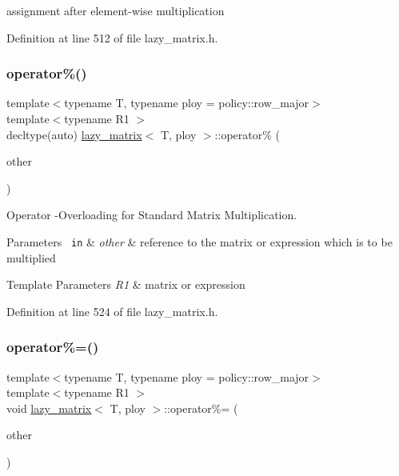 assignment after element-\/wise multiplication 



Definition at line 512 of file lazy\+\_\+matrix.\+h.

\mbox{\label{classlazy__matrix_a42ed6693e9be89298335f160e0fad5b4}} 
\subsubsection{\texorpdfstring{operator\%()}{operator\%()}}
{\footnotesize\ttfamily template$<$typename T, typename ploy = policy\+::row\+\_\+major$>$ \\
template$<$typename R1 $>$ \\
decltype(auto) \mbox{\hyperlink{classlazy__matrix}{lazy\+\_\+matrix}}$<$ T, ploy $>$\+::operator\% (\begin{DoxyParamCaption}\item[{const R1 \&}]{other }\end{DoxyParamCaption})\hspace{0.3cm}{\ttfamily [inline]}}



Operator -\/Overloading for Standard Matrix Multiplication. 


\begin{DoxyParams}[1]{Parameters}
\mbox{\texttt{ in}}  & {\em other} & reference to the matrix or expression which is to be multiplied\\
\hline
\end{DoxyParams}

\begin{DoxyTemplParams}{Template Parameters}
{\em R1} & matrix or expression \\
\hline
\end{DoxyTemplParams}


Definition at line 524 of file lazy\+\_\+matrix.\+h.

\mbox{\label{classlazy__matrix_a644e4a74c288602afd6cae4682949ab5}} 
\subsubsection{\texorpdfstring{operator\%=()}{operator\%=()}}
{\footnotesize\ttfamily template$<$typename T, typename ploy = policy\+::row\+\_\+major$>$ \\
template$<$typename R1 $>$ \\
void \mbox{\hyperlink{classlazy__matrix}{lazy\+\_\+matrix}}$<$ T, ploy $>$\+::operator\%= (\begin{DoxyParamCaption}\item[{const R1 \&}]{other }\end{DoxyParamCaption})\hspace{0.3cm}{\ttfamily [inline]}}



